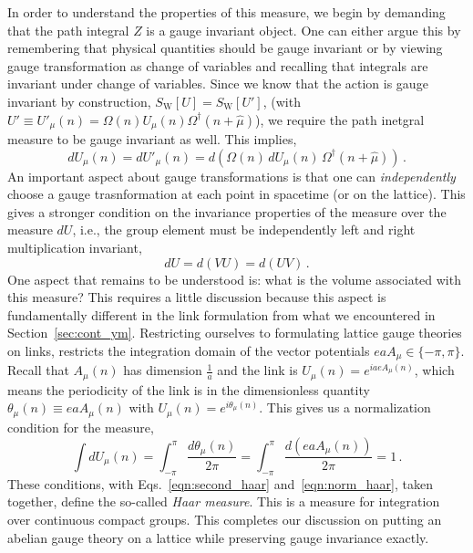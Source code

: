 \documentclass[11pt]{article}
\newcommand{\sidefact}[1]{\marginnote{\footnotesize\textcolor{green!50!black}{#1}}}
\theoremstyle{definition}
\begin{document}
In order to understand the properties of this measure, we begin by demanding that the path integral $Z$ is a gauge invariant object. One can either argue this by remembering that physical quantities should be gauge invariant or by viewing gauge transformation as change of variables and recalling that integrals are invariant under change of variables. Since we know that the action is gauge invariant by construction, $S_{\mathrm{W}}[U] = S_{\mathrm{W}}[U']$, (with $U' \equiv U'_{\mu}(n) = \Omega(n) U_{\mu}(n) \Omega^{\dagger}(n+\hat{\mu})$), we require the path inetgral measure to be gauge invariant as well.  This implies,
\begin{equation}\label{eqn:first_haar}
    dU_{\mu}(n) = dU'_{\mu}(n) = d(\Omega(n) \, dU_{\mu}(n) \, \Omega^{\dagger}(n+\hat{\mu})) \,.
\end{equation}
An important aspect about gauge transformations is that one can \textit{independently} choose a gauge trasnformation at each point in spacetime (or on the lattice). This gives a stronger condition on the invariance properties of the measure over the measure $dU$, i.e., the group element must be independently left and right multiplication invariant,
\begin{equation}\label{eqn:second_haar}
    dU = d(V U) = d(U V) \,.
\end{equation}
One aspect that remains to be understood is: what is the volume associated with this measure? This requires a little discussion because this aspect is fundamentally different in the link formulation from what we encountered in Section~\ref{sec:cont_ym}. Restricting ourselves to formulating lattice gauge theories on links, restricts the integration domain of the vector potentials $e a A_{\mu} \in \{-\pi, \pi\}$. Recall that $A_{\mu}(n)$ has dimension $\frac{1}{a}$ and the link is $U_{\mu}(n)= e^{i a e A_\mu(n)}$, which means the periodicity of the link is in the dimensionless quantity $\theta_{\mu}(n) \equiv e a A_{\mu}(n)$ with  $U_{\mu}(n) = e^{i\theta_{\mu}(n)}$. This gives us a normalization condition for the measure\sidefact{Apprently, this was first introduced by A. Hurwitz in 1897 under the name "invariant integral" (source: Wikipedia)},
\begin{equation}\label{eqn:norm_haar}
    \int dU_{\mu}(n) = \displaystyle\int^{\pi}_{-\pi} \frac{d \theta_{\mu}(n)}{2 \pi}= \displaystyle\int^{\pi}_{-\pi} \frac{d (e a A_{\mu}(n))}{2 \pi} = 1 \,.
\end{equation} 
These conditions, with Eqs.~\eqref{eqn:second_haar} and~\eqref{eqn:norm_haar}, taken together, define the so-called \textit{Haar measure}. This is a measure for integration over continuous compact groups. This completes our discussion on putting an abelian gauge theory on a lattice while preserving gauge invariance exactly.
\end{document}
